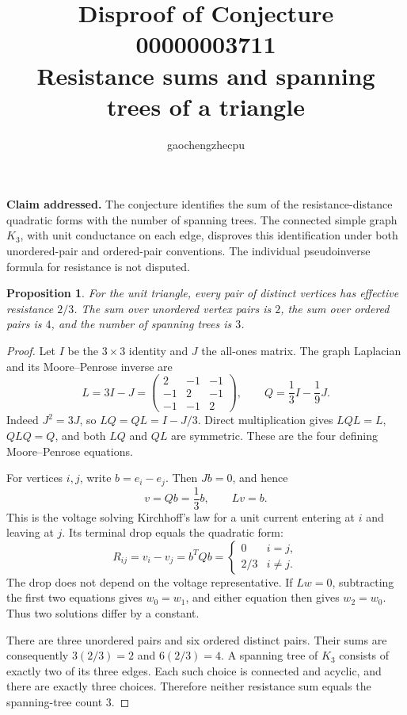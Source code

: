 \documentclass[11pt]{article}
\title{Disproof of Conjecture 00000003711\\Resistance sums and spanning trees of a triangle}
\author{gaochengzhecpu}\date{}
\newtheorem{proposition}{Proposition}
\begin{document}
\maketitle
\noindent\textbf{Claim addressed.} The conjecture identifies the sum of the resistance-distance quadratic forms with the number of spanning trees. The connected simple graph $K_3$, with unit conductance on each edge, disproves this identification under both unordered-pair and ordered-pair conventions. The individual pseudoinverse formula for resistance is not disputed.

\begin{proposition}
For the unit triangle, every pair of distinct vertices has effective resistance $2/3$. The sum over unordered vertex pairs is $2$, the sum over ordered pairs is $4$, and the number of spanning trees is $3$.
\end{proposition}
\begin{proof}
Let $I$ be the $3\times3$ identity and $J$ the all-ones matrix. The graph Laplacian and its Moore--Penrose inverse are
\[
 L=3I-J=\begin{pmatrix}2&-1&-1\\-1&2&-1\\-1&-1&2\end{pmatrix},
 \qquad Q=\frac13I-\frac19J.
\]
Indeed $J^2=3J$, so $LQ=QL=I-J/3$. Direct multiplication gives $LQL=L$, $QLQ=Q$, and both $LQ$ and $QL$ are symmetric. These are the four defining Moore--Penrose equations.

For vertices $i,j$, write $b=e_i-e_j$. Then $Jb=0$, and hence
\[
 v=Qb=\frac13b,\qquad Lv=b.
\]
This is the voltage solving Kirchhoff's law for a unit current entering at $i$ and leaving at $j$. Its terminal drop equals the quadratic form:
\[
 R_{ij}=v_i-v_j=b^TQb=
 \begin{cases}0&i=j,\\2/3&i\ne j.\end{cases}
\]
The drop does not depend on the voltage representative. If $Lw=0$, subtracting the first two equations gives $w_0=w_1$, and either equation then gives $w_2=w_0$. Thus two solutions differ by a constant.

There are three unordered pairs and six ordered distinct pairs. Their sums are consequently $3(2/3)=2$ and $6(2/3)=4$. A spanning tree of $K_3$ consists of exactly two of its three edges. Each such choice is connected and acyclic, and there are exactly three choices. Therefore neither resistance sum equals the spanning-tree count $3$.
\end{proof}
\end{document}
